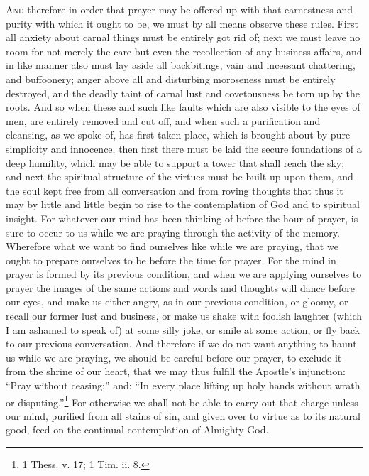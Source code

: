 \textsc{And} therefore in order that prayer may be offered up with that earnestness and purity with which it ought to be, we must by all means observe these rules. First all anxiety about carnal things must be entirely got rid of; next we must leave no room for not merely the care but even the recollection of any business affairs, and in like manner also must lay aside all backbitings, vain and incessant chattering, and buffoonery; anger above all and disturbing moroseness must be entirely destroyed, and the deadly taint of carnal lust and covetousness be torn up by the roots. And so when these and such like faults which are also visible to the eyes of men, are entirely removed and cut off, and when such a purification and cleansing, as we spoke of, has first taken place, which is brought about by pure simplicity and innocence, then first there must be laid the secure foundations of a deep humility, which may be able to support a tower that shall reach the sky; and next the spiritual structure of the virtues must be built up upon them, and the soul kept free from all conversation and from roving thoughts that thus it may by little and little begin to rise to the contemplation of God and to spiritual insight. For whatever our mind has been thinking of before the hour of prayer, is sure to occur to us while we are praying through the activity of the memory. Wherefore what we want to find ourselves like while we are praying, that we ought to prepare ourselves to be before the time for prayer. For the mind in prayer is formed by its previous condition, and when we are applying ourselves to prayer the images of the same actions and words and thoughts will dance before our eyes, and make us either angry, as in our previous condition, or gloomy, or recall our former lust and business, or make us shake with foolish laughter (which I am ashamed to speak of) at some silly joke, or smile at some action, or fly back to our previous conversation. And therefore if we do not want anything to haunt us while we are praying, we should be careful before our prayer, to exclude it from the shrine of our heart, that we may thus fulfill the Apostle’s injunction: “Pray without ceasing;” and: “In every place lifting up holy hands without wrath or disputing.”\footnote{1 Thess. v. 17; 1 Tim. ii. 8.} For otherwise we shall not be able to carry out that charge unless our mind, purified from all stains of sin, and given over to virtue as to its natural good, feed on the continual contemplation of Almighty God.


